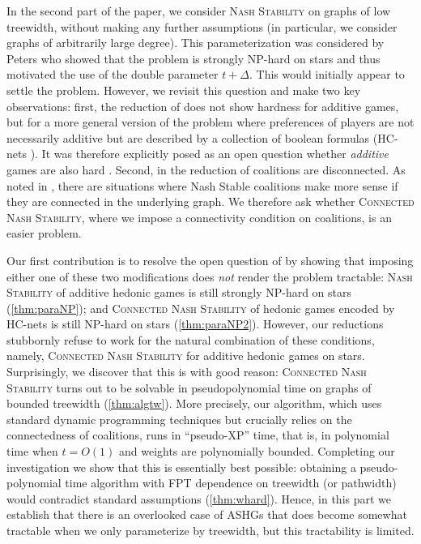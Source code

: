 \documentclass[letterpaper,USenglish,cleveref, autoref, thm-restate]{lipics-v2021}
\begin{document}
In the second part of the paper, we consider \textsc{Nash Stability} on graphs
of low treewidth, without making any further assumptions (in particular, we
consider graphs of arbitrarily large degree).  This parameterization was
considered by Peters \cite{Peters16a} who showed that the problem is strongly
NP-hard on stars and thus motivated the use of the double parameter $t+\Delta$.
This would initially appear to settle the problem.  However, we revisit this
question and make two key observations: first, the reduction of
\cite{Peters16a} does not show hardness for additive games, but for a more
general version of the problem where preferences of players are not necessarily
additive but are described by a collection of boolean formulas (HC-nets
\cite{ElkindW09,IeongS05}).  
It was therefore explicitly posed as an open question whether \emph{additive}
games are also hard \cite{Peters16a}.  Second, in the reduction of
\cite{Peters16a} coalitions are disconnected.  As noted in
\cite{IgarashiE16,Peters16a}, there are situations where Nash Stable coalitions
make more sense if they are connected in the underlying graph. We therefore ask
whether \textsc{Connected Nash Stability}, where we impose a connectivity
condition on coalitions, is an easier problem.  

Our first contribution is to resolve the open question of \cite{Peters16a} by
showing that imposing either one of these two modifications does \emph{not}
render the problem tractable: \textsc{Nash Stability} of additive hedonic games
is still strongly NP-hard on stars (\cref{thm:paraNP}); and \textsc{Connected
Nash Stability} of hedonic games encoded by HC-nets is still NP-hard on stars
(\cref{thm:paraNP2}).  However, our reductions stubbornly refuse to work for
the natural combination of these conditions, namely, \textsc{Connected Nash
Stability} for additive hedonic games on stars.  Surprisingly, we discover that
this is with good reason: \textsc{Connected Nash Stability} turns out to be
solvable in pseudopolynomial time on graphs of bounded treewidth
(\cref{thm:algtw}).  More precisely, our algorithm, which uses standard dynamic
programming techniques but crucially relies on the connectedness of coalitions,
runs in ``pseudo-XP'' time, that is, in polynomial time when $t=O(1)$ and
weights are polynomially bounded. Completing our investigation we show that
this is essentially best possible: obtaining a pseudo-polynomial time algorithm
with FPT dependence on treewidth (or pathwidth) would contradict standard
assumptions (\cref{thm:whard}).  Hence, in this part we establish that there is
an overlooked case of ASHGs that does become somewhat tractable when we only
parameterize by treewidth, but this tractability is limited.
\end{document}
